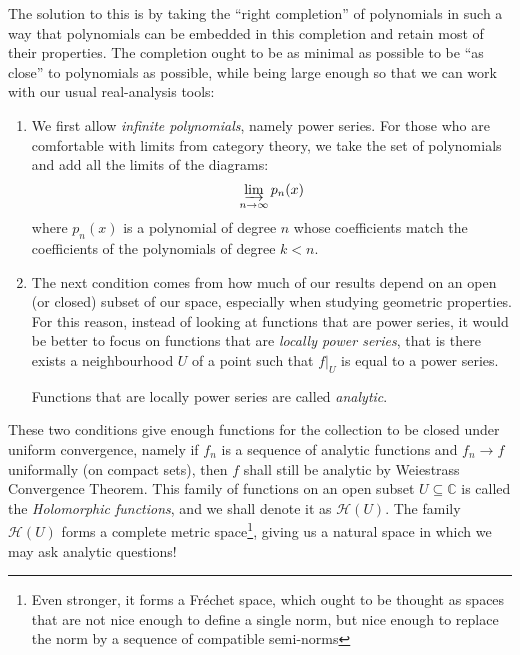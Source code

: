 \documentclass[oneside]{article}
\newcommand{\C}{\mathbb{C}}
\newcommand{\CH}{\mathcal{H}}
\newcommand{\sse}{\subseteq}
\newcommand{\colim}{\varinjlim}
\begin{document}
The solution to this is by taking the ``right completion'' of polynomials in such a way that polynomials can
be embedded in this completion and retain most of their properties. The completion ought to be as minimal
as possible to be ``as close'' to polynomials as possible, while being large enough so that we can work with
our usual real-analysis tools:

\begin{enumerate}
  \item We first allow \emph{infinite polynomials}, namely power series. For those who are comfortable with
    limits from category theory, we take the set of polynomials and add all the limits of the diagrams:
    \[
      \colim_{n \to \infty} p_n(x)
    \]
    where $p_n(x)$ is a polynomial of degree $n$ whose coefficients match the coefficients of the polynomials of
    degree $k< n$.
   \item The next condition comes from how much of our results depend on an open (or closed) subset of our
     space, especially when studying geometric properties. For this reason, instead of looking at functions
     that are power series, it would be better to focus on functions that are \emph{locally power series},
     that is there exists a neighbourhood $U$ of a point such that $f|_U$ is equal to a power series.

     Functions that are locally power series are called \emph{analytic}.
\end{enumerate}

These two conditions give enough functions for the collection to be closed under uniform convergence, namely
if $f_n$ is a sequence of analytic functions and  $f_n \to f$ uniformally (on compact sets), then $f$ shall
still be analytic by Weiestrass Convergence Theorem. This family of functions on an open subset
$U \sse \C$ is called the \emph{Holomorphic functions}, and we shall denote it as $\CH(U)$. The family
$\CH(U)$ forms a complete metric space\footnote{Even stronger, it forms a Fr\'echet space, which ought to be
  thought as spaces that are not nice enough to define a single norm, but nice enough to replace the norm by a
sequence of compatible semi-norms}, giving us a natural space in which we may ask analytic questions!
\end{document}
